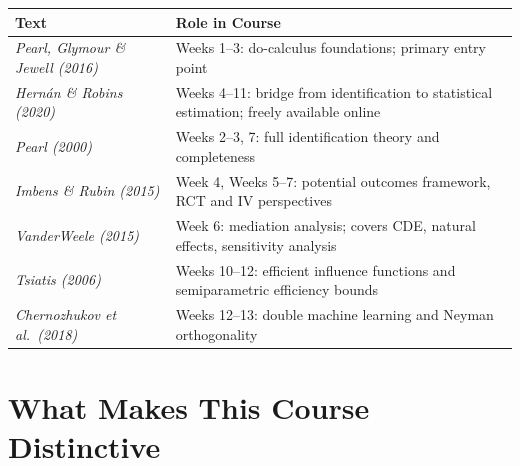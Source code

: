 \documentclass[12pt]{article}
\begin{document}
\begingroup
\small
\setlength{\tabcolsep}{6pt}
\renewcommand{\arraystretch}{1.4}

\begin{tabularx}{\linewidth}{L{5.2cm} X}
  \toprule
  \color{white}\textbf{Text} &
  \color{white}\textbf{Role in Course} \\
  \midrule
  \textit{Pearl, Glymour \& Jewell (2016)}
    & Weeks 1--3: do-calculus foundations; primary entry point \\
  \textit{Hern\'an \& Robins (2020)}
    & Weeks 4--11: bridge from identification to statistical
      estimation; freely available online \\
  \textit{Pearl (2000)}
    & Weeks 2--3, 7: full identification theory and completeness \\
  \textit{Imbens \& Rubin (2015)}
    & Week 4, Weeks 5--7: potential outcomes framework,
      RCT and IV perspectives \\
  \textit{VanderWeele (2015)}
    & Week 6: mediation analysis; covers CDE, natural effects,
      sensitivity analysis \\
  \textit{Tsiatis (2006)}
    & Weeks 10--12: efficient influence functions and semiparametric
      efficiency bounds \\
  \textit{Chernozhukov et al.\ (2018)}
    & Weeks 12--13: double machine learning and Neyman orthogonality \\
  \bottomrule
\end{tabularx}
\endgroup

\section{What Makes This Course Distinctive}
\end{document}
